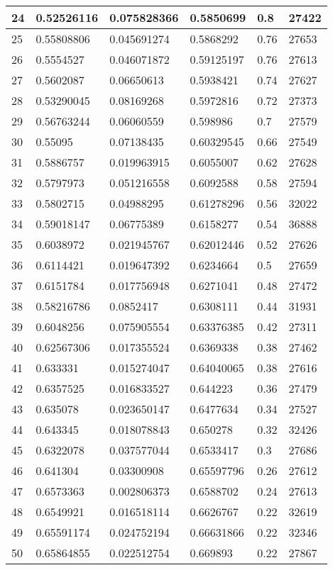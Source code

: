 \begin{longtable}{|l|l|l|l|l|l|}
24 & 0.52526116 & 0.075828366 & 0.5850699 & 0.8 & 27422 \\ \hline 
25 & 0.55808806 & 0.045691274 & 0.5868292 & 0.76 & 27653 \\ \hline 
26 & 0.5554527 & 0.046071872 & 0.59125197 & 0.76 & 27613 \\ \hline 
27 & 0.5602087 & 0.06650613 & 0.5938421 & 0.74 & 27627 \\ \hline 
28 & 0.53290045 & 0.08169268 & 0.5972816 & 0.72 & 27373 \\ \hline 
29 & 0.56763244 & 0.06060559 & 0.598986 & 0.7 & 27579 \\ \hline 
30 & 0.55095 & 0.07138435 & 0.60329545 & 0.66 & 27549 \\ \hline 
31 & 0.5886757 & 0.019963915 & 0.6055007 & 0.62 & 27628 \\ \hline 
32 & 0.5797973 & 0.051216558 & 0.6092588 & 0.58 & 27594 \\ \hline 
33 & 0.5802715 & 0.04988295 & 0.61278296 & 0.56 & 32022 \\ \hline 
34 & 0.59018147 & 0.06775389 & 0.6158277 & 0.54 & 36888 \\ \hline 
35 & 0.6038972 & 0.021945767 & 0.62012446 & 0.52 & 27626 \\ \hline 
36 & 0.6114421 & 0.019647392 & 0.6234664 & 0.5 & 27659 \\ \hline 
37 & 0.6151784 & 0.017756948 & 0.6271041 & 0.48 & 27472 \\ \hline 
38 & 0.58216786 & 0.0852417 & 0.6308111 & 0.44 & 31931 \\ \hline 
39 & 0.6048256 & 0.075905554 & 0.63376385 & 0.42 & 27311 \\ \hline 
40 & 0.62567306 & 0.017355524 & 0.6369338 & 0.38 & 27462 \\ \hline 
41 & 0.633331 & 0.015274047 & 0.64040065 & 0.38 & 27616 \\ \hline 
42 & 0.6357525 & 0.016833527 & 0.644223 & 0.36 & 27479 \\ \hline 
43 & 0.635078 & 0.023650147 & 0.6477634 & 0.34 & 27527 \\ \hline 
44 & 0.643345 & 0.018078843 & 0.650278 & 0.32 & 32426 \\ \hline 
45 & 0.6322078 & 0.037577044 & 0.6533417 & 0.3 & 27686 \\ \hline 
46 & 0.641304 & 0.03300908 & 0.65597796 & 0.26 & 27612 \\ \hline 
47 & 0.6573363 & 0.002806373 & 0.6588702 & 0.24 & 27613 \\ \hline 
48 & 0.6549921 & 0.016518114 & 0.6626767 & 0.22 & 32619 \\ \hline 
49 & 0.65591174 & 0.024752194 & 0.66631866 & 0.22 & 32346 \\ \hline 
50 & 0.65864855 & 0.022512754 & 0.669893 & 0.22 & 27867 \\ \hline 
\end{longtable}
